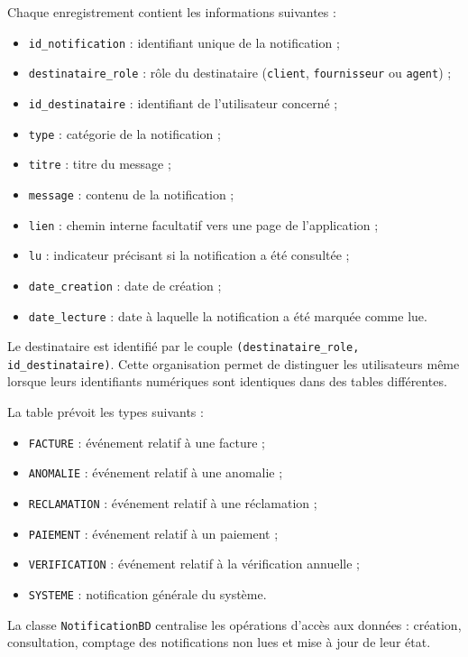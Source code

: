 Chaque enregistrement contient les informations suivantes :
\begin{itemize}
    \item \texttt{id\_notification} : identifiant unique de la notification ;
    \item \texttt{destinataire\_role} : rôle du destinataire (\texttt{client}, \texttt{fournisseur} ou \texttt{agent}) ;
    \item \texttt{id\_destinataire} : identifiant de l'utilisateur concerné ;
    \item \texttt{type} : catégorie de la notification ;
    \item \texttt{titre} : titre du message ;
    \item \texttt{message} : contenu de la notification ;
    \item \texttt{lien} : chemin interne facultatif vers une page de l'application ;
    \item \texttt{lu} : indicateur précisant si la notification a été consultée ;
    \item \texttt{date\_creation} : date de création ;
    \item \texttt{date\_lecture} : date à laquelle la notification a été marquée comme lue.
\end{itemize}

Le destinataire est identifié par le couple \texttt{(destinataire\_role, id\_destinataire)}. Cette organisation permet de distinguer les utilisateurs même lorsque leurs identifiants numériques sont identiques dans des tables différentes.

La table prévoit les types suivants :
\begin{itemize}
    \item \texttt{FACTURE} : événement relatif à une facture ;
    \item \texttt{ANOMALIE} : événement relatif à une anomalie ;
    \item \texttt{RECLAMATION} : événement relatif à une réclamation ;
    \item \texttt{PAIEMENT} : événement relatif à un paiement ;
    \item \texttt{VERIFICATION} : événement relatif à la vérification annuelle ;
    \item \texttt{SYSTEME} : notification générale du système.
\end{itemize}

La classe \texttt{NotificationBD} centralise les opérations d'accès aux données : création, consultation, comptage des notifications non lues et mise à jour de leur état.

